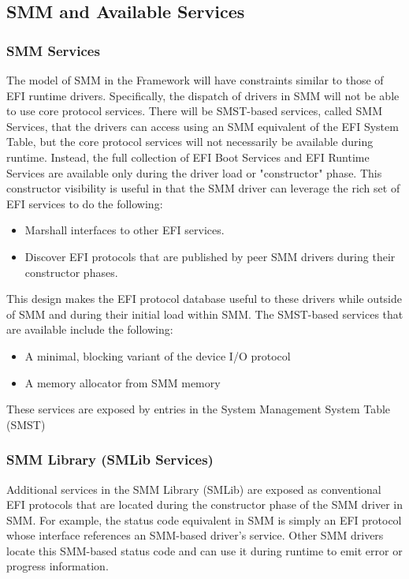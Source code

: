 \subsection{SMM and Available Services}\label{subsection-smm-available-services}

\subsubsection{SMM Services}\label{subsection-smm-services}
The model of SMM in the Framework will have constraints similar to those of EFI runtime drivers.
Specifically, the dispatch of drivers in SMM will not be able to use core protocol services. There
will be SMST-based services, called SMM Services, that the drivers can access using an SMM
equivalent of the EFI System Table, but the core protocol services will not necessarily be available
during runtime.
Instead, the full collection of EFI Boot Services and EFI Runtime Services are available only
during the driver load or "constructor" phase. This constructor visibility is useful in that the SMM
driver can leverage the rich set of EFI services to do the following:
\begin{itemize}
	\item Marshall interfaces to other EFI services.
	\item Discover EFI protocols that are published by peer SMM drivers during their constructor phases.
\end{itemize}
This design makes the EFI protocol database useful to these drivers while outside of SMM and
during their initial load within SMM.
The SMST-based services that are available include the following:
\begin{itemize}
	\item A minimal, blocking variant of the device I/O protocol
	\item A memory allocator from SMM memory
\end{itemize}
These services are exposed by entries in the System Management System Table (SMST)

\subsubsection{SMM Library (SMLib Services)}\label{subsection-smm-lib}
Additional services in the SMM Library (SMLib) are exposed as conventional EFI protocols that
are located during the constructor phase of the SMM driver in SMM. For example, the status code
equivalent in SMM is simply an EFI protocol whose interface references an SMM-based driver's
service. Other SMM drivers locate this SMM-based status code and can use it during runtime to
emit error or progress information.

